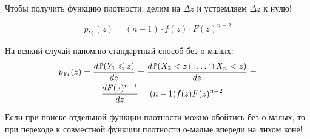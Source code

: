 \begin{myex}
Чтобы получить функцию плотности: делим на $ \Delta z $ и устремляем $ \Delta z $ к нулю!

\begin{equation}
p_{Y_{1}}(z)=(n-1)\cdot f(z)\cdot F(z)^{n-2}
\end{equation}


На всякий случай напомню стандартный способ без о-малых:
\begin{multline}
p_{Y_{1}}(z)=\frac{d\P(Y_{1}\leq z)}{dz}=\frac{d \P(X_{2}<z\cap\ldots\cap X_{n}<z)}{dz}=\\
=\frac{dF(z)^{n-1}}{dz}=(n-1)f(z)F(z)^{n-2}
\end{multline}
\end{myex}



Если при поиске отдельной функции плотности можно обойтись без о-малых, то при переходе к совместной функции плотности о-малые впереди на лихом коне!

